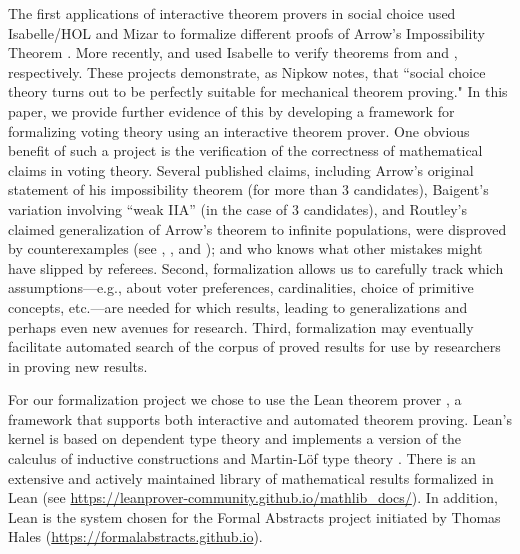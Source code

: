 \documentclass[runningheads]{llncs}
\begin{document}
The first applications of interactive theorem provers in social choice used Isabelle/HOL  \cite{Nipkow2009} and Mizar \cite{Wiedijk2007} to formalize different proofs of  Arrow's Impossibility Theorem \cite{Geanakoplos2005}.  More recently, \cite{Brandt2018b} and \cite{Eberl2019} used Isabelle to verify theorems from \cite{Brandt2018} and \cite{Brandl2018}, respectively.  These projects demonstrate, as Nipkow \cite{Nipkow2009} notes,  that ``social choice theory turns out to be perfectly suitable for mechanical theorem proving."  In this paper, we provide further evidence of this by developing a framework for formalizing voting theory using an interactive theorem prover. One obvious benefit of such a project is the verification of the correctness of mathematical claims in voting theory. Several published claims, including Arrow's \cite{Arrow1951} original statement of his impossibility theorem (for more than 3 candidates), Baigent's \cite{Baigent1987} variation involving ``weak IIA'' (in the case of 3 candidates), and Routley's \cite{} claimed generalization of Arrow's theorem to infinite populations, were disproved by counterexamples (see \cite{Blau1957}, \cite{Campbell2000}, and \cite{Blau1979}); and who knows what other mistakes might have slipped by referees. Second, formalization allows us to carefully track  which assumptions---e.g., about voter preferences, cardinalities, choice of primitive concepts, etc.---are needed for which results, leading to generalizations and perhaps even new avenues for research. Third, formalization may eventually facilitate automated search of the corpus of proved results for use by researchers in proving new results.


For our formalization project we chose to use the Lean theorem prover \cite{Lean}, a framework that supports both interactive and automated theorem proving.   Lean's kernel is based on dependent type theory and   implements a version of the calculus of inductive constructions \cite{Coquand1988}  and Martin-L\"of type theory \cite{MartinLof1984}. There is an extensive and actively maintained  library of mathematical results formalized in Lean (see \url{https://leanprover-community.github.io/mathlib_docs/}). In addition, Lean is the system chosen for the Formal Abstracts project initiated by Thomas Hales (\url{https://formalabstracts.github.io}). %
 
\end{document}
